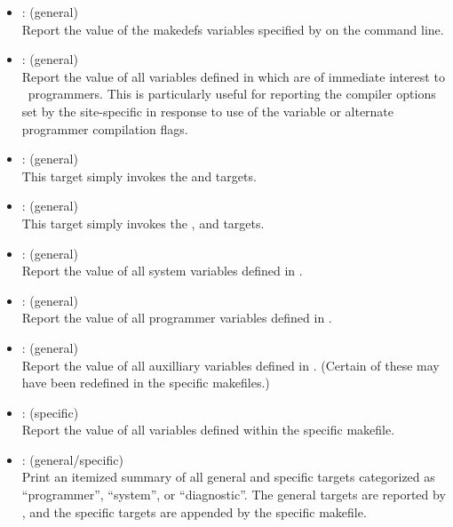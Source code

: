 \begin{itemize}
\item
    : (general)
   \\ Report the value of the makedefs variables specified by  on
   the  command line.

\item
    : (general)
   \\ Report the value of all variables defined in  which are of
   immediate interest to \aipspp\ programmers.  This is particularly useful
   for reporting the compiler options set by the site-specific 
   in response to use of the  variable or alternate programmer
   compilation flags.

\item
    : (general)
   \\ This target simply invokes the  and 
   targets.

\item
     : (general)
   \\ This target simply invokes the ,  and
    targets.

\item
     : (general)
   \\ Report the value of all system variables defined in .

\item
     : (general)
   \\ Report the value of all programmer variables defined in .

\item
     : (general)
   \\ Report the value of all auxilliary variables defined in .
   (Certain of these may have been redefined in the specific makefiles.)

\item
    : (specific)
   \\ Report the value of all variables defined within the specific makefile.

\item
    : (general/specific)
   \\ Print an itemized summary of all general and specific targets categorized
   as ``programmer'', ``system'', or ``diagnostic''.  The general targets are
   reported by , and the specific targets are appended by the
   specific makefile.
\end{itemize}

